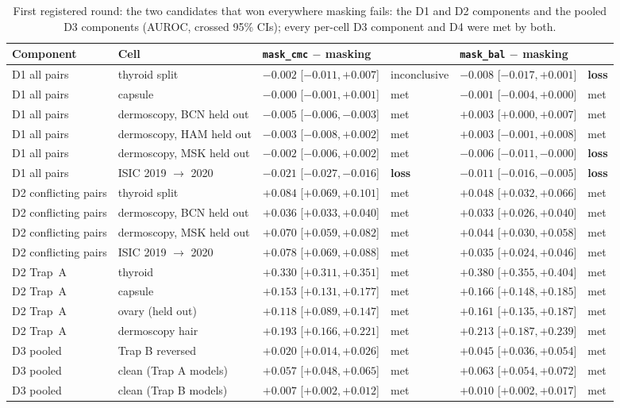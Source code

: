 \begin{table}[H]\centering\scriptsize
\caption{First registered round: the two candidates that won everywhere masking fails: the D1 and D2 components and the pooled D3 components (AUROC, crossed 95\% CIs); every per-cell D3 component and D4 were met by both.}\label{tab:s17rEightc}
\begin{tabular}{p{2.3cm}p{3.3cm}p{2.9cm}p{1.4cm}p{2.9cm}p{1.4cm}}\toprule
Component & Cell & \texttt{mask\_cmc} $-$ masking &  & \texttt{mask\_bal} $-$ masking &  \\\midrule
D1 all pairs & thyroid split & $-0.002$ [$-0.011, +0.007$] & inconclusive & $-0.008$ [$-0.017, +0.001$] & \textbf{loss} \\
D1 all pairs & capsule & $-0.000$ [$-0.001, +0.001$] & met & $-0.001$ [$-0.004, +0.000$] & met \\
D1 all pairs & dermoscopy, BCN held out & $-0.005$ [$-0.006, -0.003$] & met & $+0.003$ [$+0.000, +0.007$] & met \\
D1 all pairs & dermoscopy, HAM held out & $-0.003$ [$-0.008, +0.002$] & met & $+0.003$ [$-0.001, +0.008$] & met \\
D1 all pairs & dermoscopy, MSK held out & $-0.002$ [$-0.006, +0.002$] & met & $-0.006$ [$-0.011, -0.000$] & \textbf{loss} \\
D1 all pairs & ISIC 2019 $\to$ 2020 & $-0.021$ [$-0.027, -0.016$] & \textbf{loss} & $-0.011$ [$-0.016, -0.005$] & \textbf{loss} \\
D2 conflicting pairs & thyroid split & $+0.084$ [$+0.069, +0.101$] & met & $+0.048$ [$+0.032, +0.066$] & met \\
D2 conflicting pairs & dermoscopy, BCN held out & $+0.036$ [$+0.033, +0.040$] & met & $+0.033$ [$+0.026, +0.040$] & met \\
D2 conflicting pairs & dermoscopy, MSK held out & $+0.070$ [$+0.059, +0.082$] & met & $+0.044$ [$+0.030, +0.058$] & met \\
D2 conflicting pairs & ISIC 2019 $\to$ 2020 & $+0.078$ [$+0.069, +0.088$] & met & $+0.035$ [$+0.024, +0.046$] & met \\
D2 Trap~A & thyroid & $+0.330$ [$+0.311, +0.351$] & met & $+0.380$ [$+0.355, +0.404$] & met \\
D2 Trap~A & capsule & $+0.153$ [$+0.131, +0.177$] & met & $+0.166$ [$+0.148, +0.185$] & met \\
D2 Trap~A & ovary (held out) & $+0.118$ [$+0.089, +0.147$] & met & $+0.161$ [$+0.135, +0.187$] & met \\
D2 Trap~A & dermoscopy hair & $+0.193$ [$+0.166, +0.221$] & met & $+0.213$ [$+0.187, +0.239$] & met \\
D3 pooled & Trap B reversed & $+0.020$ [$+0.014, +0.026$] & met & $+0.045$ [$+0.036, +0.054$] & met \\
D3 pooled & clean (Trap A models) & $+0.057$ [$+0.048, +0.065$] & met & $+0.063$ [$+0.054, +0.072$] & met \\
D3 pooled & clean (Trap B models) & $+0.007$ [$+0.002, +0.012$] & met & $+0.010$ [$+0.002, +0.017$] & met \\
\bottomrule\end{tabular}
\end{table}
